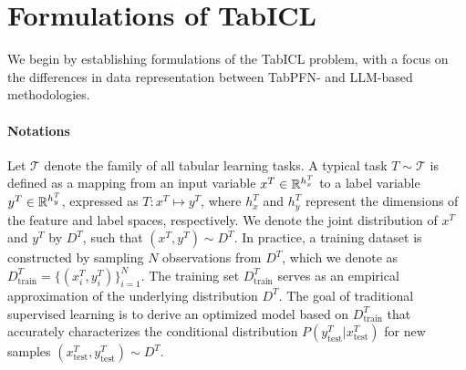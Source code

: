 \section{Formulations of TabICL}
\label{sec:formulation}

We begin by establishing formulations of the TabICL problem, with a focus on the differences in data representation between TabPFN- and LLM-based methodologies.

\paragraph{Notations}
Let $\mathcal{T}$ denote the family of all tabular learning tasks. A typical task $T \sim \mathcal{T}$ is defined as a mapping from an input variable $x^T \in \mathbb{R}^{h_x^T}$ to a label variable $y^T \in \mathbb{R}^{h_y^T}$, expressed as $T: x^T \mapsto y^T$, where $h_x^T$ and $h_y^T$ represent the dimensions of the feature and label spaces, respectively.
We denote the joint distribution of $x^T$ and $y^T$ by $D^T$, such that $(x^T, y^T) \sim D^T$. In practice, a training dataset is constructed by sampling $N$ observations from $D^T$, which we denote as $D^T_{\text{train}} = \{(x^T_i, y^T_i)\}_{i=1}^N$. The training set $D^T_{\text{train}}$ serves as an empirical approximation of the underlying distribution $D^T$.
The goal of traditional supervised learning is to derive an optimized model based on $D^T_{\text{train}}$ that accurately characterizes the conditional distribution $P(y^T_{\text{test}} | x^T_{\text{test}})$ for new samples $(x^T_{\text{test}}, y^T_{\text{test}}) \sim D^T$.


